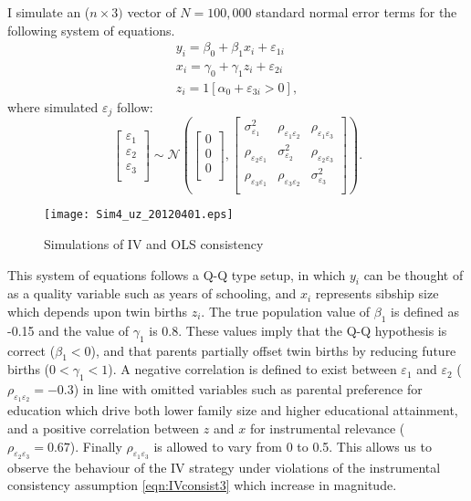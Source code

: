 \documentclass{article}[11pt,subeqn]
\begin{document}
\begin{spacing}{1.25}
I simulate an ($n \times 3)$ vector of $N=100,000$ standard normal error terms for the following system of equations.
\begin{eqnarray}
\label{eqn:MC1}
y_i=\beta_0+\beta_1 x_i + \varepsilon_{1i} \nonumber\\
x_i=\gamma_0 + \gamma_1 z_i + \varepsilon_{2i} \nonumber\\
z_i=1[\alpha_0+\varepsilon_{3i}>0], \nonumber
\end{eqnarray} 
where simulated $\varepsilon_j$ follow:
\begin{equation}
\begin{bmatrix}
\varepsilon_1\\
\varepsilon_2\\
\varepsilon_3\\
\end{bmatrix}
\sim \mathcal{N}
\left(\begin{bmatrix}
0\\
0\\
0\\
\end{bmatrix}
,
\begin{bmatrix}
\sigma_{\varepsilon_1}^2 &  \rho_{\varepsilon_1\varepsilon_2} &  \rho_{\varepsilon_1\varepsilon_3}\\
\rho_{\varepsilon_2\varepsilon_1} & \sigma_{\varepsilon_2}^2 &  \rho_{\varepsilon_2\varepsilon_3} \\
\rho_{\varepsilon_3\varepsilon_1}&  \rho_{\varepsilon_3\varepsilon_2}& \sigma_{\varepsilon_3}^2 \\
\end{bmatrix}\right).
\end{equation}

\begin{figure}[!htbp]
\caption{Simulations of IV and OLS consistency}
\label{fig:MC}
\begin{center}
\vspace{-4mm}
\texttt{[image: Sim4\_uz\_20120401.eps]}
\end{center}
\end{figure}
This system of equations follows a Q-Q type setup, in which $y_i$ can be thought of as a quality variable such as years of schooling, and $x_i$ represents
sibship size which depends upon twin births $z_i$. The true population value of $\beta_1$ is defined as -0.15 and the value of $\gamma_1$ is 0.8.  These
values imply that the Q-Q hypothesis is correct ($\beta_1<0$), and that parents partially offset twin births by reducing future births ($0<\gamma_1<1$).
A negative correlation is defined to exist between $\varepsilon_1$ and $\varepsilon_2$ ($\rho_{\varepsilon_1\varepsilon_2}=-0.3$) in line with omitted variables such as
parental preference for education which drive both lower family size and higher educational attainment, and a positive correlation between $z$ and $x$ for
instrumental relevance ($\rho_{\varepsilon_2\varepsilon_3}=0.67$). Finally $\rho_{\varepsilon_1\varepsilon_3}$ is allowed to vary from 0 to 0.5.  This allows
us to observe the behaviour of the IV strategy under violations of the instrumental consistency assumption \ref{eqn:IVconsist3} which increase in magnitude.


\end{spacing}
\end{document}
